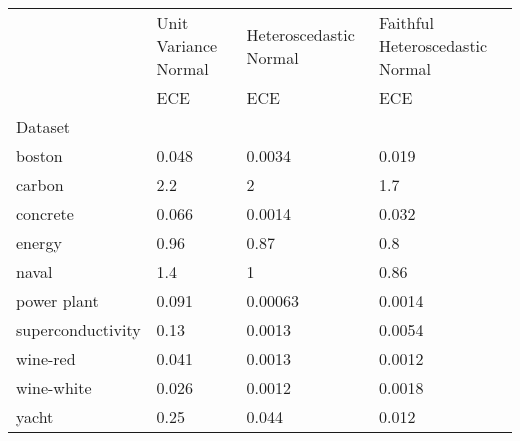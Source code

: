 \begin{tabular}{l|l|l|l}
\toprule
 & Unit Variance Normal & Heteroscedastic Normal & Faithful Heteroscedastic Normal \\
 & ECE & ECE & ECE \\
Dataset &  &  &  \\
\midrule
boston & 0.048 & 0.0034 & 0.019 \\
carbon & 2.2 & 2 & 1.7 \\
concrete & 0.066 & 0.0014 & 0.032 \\
energy & 0.96 & 0.87 & 0.8 \\
naval & 1.4 & 1 & 0.86 \\
power plant & 0.091 & 0.00063 & 0.0014 \\
superconductivity & 0.13 & 0.0013 & 0.0054 \\
wine-red & 0.041 & 0.0013 & 0.0012 \\
wine-white & 0.026 & 0.0012 & 0.0018 \\
yacht & 0.25 & 0.044 & 0.012 \\
\bottomrule
\end{tabular}
